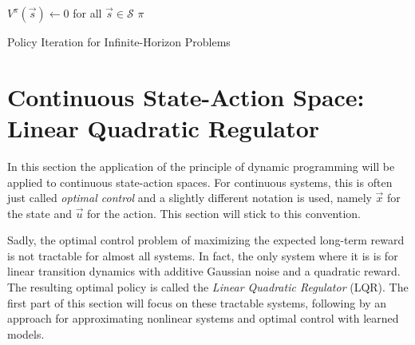 				\begin{algorithm}  \DontPrintSemicolon
					\( V^\pi(\vec{s}) \gets 0 \) for all \( \vec{s} \in \mathcal{S} \) \;
					\Return \( \pi \) \;

					\caption{Policy Iteration for Infinite-Horizon Problems}
					\label{alg:policyIteration}
				\end{algorithm}

	\section{Continuous State-Action Space: Linear Quadratic Regulator}
		In this section the application of the principle of dynamic programming will be applied to continuous state-action spaces. For continuous systems, this is often just called \emph{optimal control} and a slightly different notation is used, namely \(\vec{x}\) for the state and \(\vec{u}\) for the action. This section will stick to this convention.

		Sadly, the optimal control problem of maximizing the expected long-term reward is not tractable for almost all systems. In fact, the only system where it is is for linear transition dynamics with additive Gaussian noise and a quadratic reward. The resulting optimal policy is called the \emph{Linear Quadratic Regulator} (LQR). The first part of this section will focus on these tractable systems, following by an approach for approximating nonlinear systems and optimal control with learned models.

